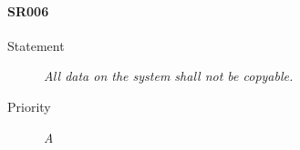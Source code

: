 \paragraph{SR006}
  \begin{description}
  \item [Statement] 
    \textit{ All data on the system shall not be copyable.}
  \item [Priority] \textit{A}
\end{description}